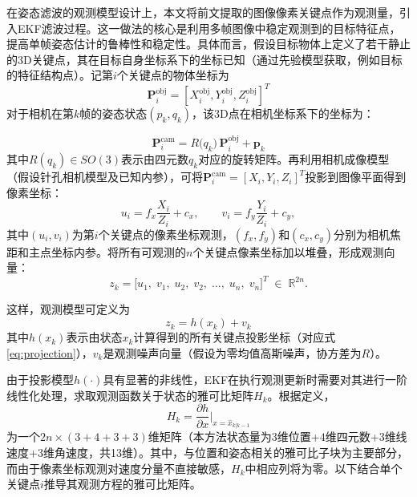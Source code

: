 在姿态滤波的观测模型设计上，本文将前文提取的图像像素关键点作为观测量，引入EKF滤波过程。这一做法的核心是利用多帧图像中稳定观测到的目标特征点，提高单帧姿态估计的鲁棒性和稳定性。具体而言，假设目标物体上定义了若干静止的3D关键点，其在目标自身坐标系下的坐标已知（通过先验模型获取，例如目标的特征结构点）。记第$i$个关键点的物体坐标为
\begin{equation}
	\mathbf{P}_i^{\mathrm{obj}}=[X_i^{\mathrm{obj}}, Y_i^{\mathrm{obj}}, Z_i^{\mathrm{obj}}]^T
\end{equation}
对于相机在第$k$帧的姿态状态$(p_k,q_k)$，该3D点在相机坐标系下的坐标为：

\begin{equation}
	\mathbf{P}_i^{\mathrm{cam}} = R\bigl(q_k\bigr)\,\mathbf{P}_i^{\mathrm{obj}} + \mathbf{p}_k
\end{equation}
其中$R(q_k)\in SO(3)$表示由四元数$q_k$对应的旋转矩阵。再利用相机成像模型（假设针孔相机模型及已知内参），可将$\mathbf{P}_i^{\mathrm{cam}}=[X_i, Y_i, Z_i]^T$投影到图像平面得到像素坐标： 
\begin{equation}
	\label{eq:projection}
	 u_i = f_x \frac{X_i}{Z_i} + c_x, \qquad v_i = f_y \frac{Y_i}{Z_i} + c_y, 
\end{equation} 其中$(u_i,v_i)$为第$i$个关键点的像素坐标观测，$(f_x, f_y)$和$(c_x, c_y)$分别为相机焦距和主点坐标内参。将所有可观测的$n$个关键点像素坐标加以堆叠，形成观测向量：
\begin{equation}
	z_k = \bigl[u_1,\;v_1,\;u_2,\;v_2,\;\dots,\;u_n,\;v_n\bigr]^T \;\in\; \mathbb{R}^{2n}.
\end{equation}

这样，观测模型可定义为
\begin{equation}
	z_k = h(x_k) + v_k
\end{equation}
其中$h(x_k)$表示由状态$x_k$计算得到的所有关键点投影坐标（对应式\eqref{eq:projection}），$v_k$是观测噪声向量（假设为零均值高斯噪声，协方差为$R$）。

由于投影模型$h(\cdot)$具有显著的非线性，EKF在执行观测更新时需要对其进行一阶线性化处理，求取观测函数关于状态的雅可比矩阵$H_k$。根据定义，
\begin{equation}
	H_k = \frac{\partial h}{\partial x}\big|_{x=\hat{x}_{k|k-1}}
\end{equation}
为一个$2n \times (3+4+3+3)$维矩阵（本方法状态量为$3$维位置+$4$维四元数+$3$维线速度+$3$维角速度，共13维）。其中，与位置和姿态相关的雅可比子块为主要部分，而由于像素坐标观测对速度分量不直接敏感，$H_k$中相应列将为零。以下结合单个关键点$i$推导其观测方程的雅可比矩阵。

